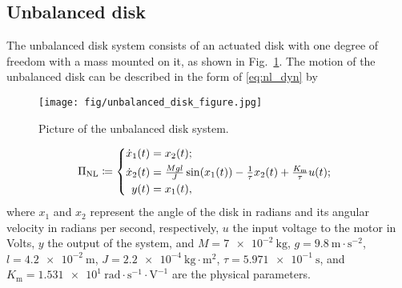 \subsection{Unbalanced disk \label{sec:unbalanced_disk}}
The unbalanced disk system consists of an actuated disk with one degree of freedom with a mass mounted on it, as shown in Fig.~\ref{fig:unbalanced_disk}. The motion of the unbalanced disk can be described in the form of \eqref{eq:nl_dyn} by
\begin{figure}[t]
    \centering
    \texttt{[image: fig/unbalanced\_disk\_figure.jpg]}
    \caption{Picture of the unbalanced disk system.}
    \label{fig:unbalanced_disk}
\end{figure}
%
\begin{equation} \label{eq:unbalanced_disk}
    \hspace{-2mm}  \Pi_\mathrm{NL} \coloneq \left\{
    \begin{aligned}
        \dot{x}_1(t) & = x_2(t);                                                                                   \\
        \dot{x}_2(t) & = \tfrac{M g l}{J} \sin(x_1(t)) - \tfrac{1}{\tau} x_2(t) + \tfrac{K_\mathrm{m}}{\tau} u(t); \\
        y(t)         & = x_1(t),
    \end{aligned}\right.
\end{equation}
where $x_1$ and $x_2$ represent the angle of the disk in radians and its angular velocity in radians per second, respectively, $u$ the input voltage to the motor in Volts, $y$ the output of the system, and $M = \num{7e-2} \ \mathrm{kg}$, $g = \num{9.8} \ \mathrm{m \cdot s^{-2}}$, $l = \num{4.2e-2} \ \mathrm{m}$, $J = \num{2.2e-4} \ \mathrm{kg \cdot m^2}$, $\tau = \num{5.971e-1} \ \mathrm{s}$, and $K_\mathrm{m} = \num{1.531e1} \ \mathrm{rad \cdot s^{-1} \cdot V^{-1}}$ are the physical parameters.
%

